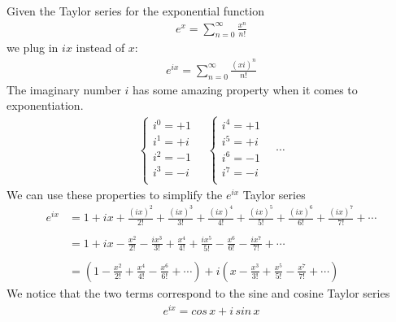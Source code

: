 \documentclass{article}
\begin{document}
Given the Taylor series for the exponential function
\begin{align*}
    e^x=\sum_{n=0}^{\infty}\frac{x^n}{n!}
\end{align*}
we plug in \(ix\) instead of \(x\):
\begin{align*}
    e^{ix}=\sum_{n=0}^{\infty}\frac{(xi)^n}{n!}
\end{align*}
The imaginary number \(i\) has some amazing property when it comes to exponentiation.
\begin{align*}
    \begin{cases}
        i^0=+1\\
        i^1=+i\\
        i^2=-1\\
        i^3=-i\\
    \end{cases}
    \quad
    \begin{cases}
        i^4=+1\\
        i^5=+i\\
        i^6=-1\\
        i^7=-i\\
    \end{cases}
    \quad
    \cdots
\end{align*}
We can use these properties to simplify the \(e^{ix}\) Taylor series
\begin{align*}
    e^{ix}
    &   =1
        +ix
        +\frac{(ix)^2}{2!}
        +\frac{(ix)^3}{3!}
        +\frac{(ix)^4}{4!}
        +\frac{(ix)^5}{5!}
        +\frac{(ix)^6}{6!}
        +\frac{(ix)^7}{7!}
        +\cdots
    \\
    \\
    &   =1
        +ix
        -\frac{x^2}{2!}
        -\frac{ix^3}{3!}
        +\frac{x^4}{4!}
        +\frac{ix^5}{5!}
        -\frac{x^6}{6!}
        -\frac{ix^7}{7!}
        +\cdots
    \\
    \\
    &=
    \left(
        1
        -\frac{x^2}{2!}
        +\frac{x^4}{4!}
        -\frac{x^6}{6!}
        +\cdots
    \right)
    +i
    \left(
        x
        -\frac{x^3}{3!}
        +\frac{x^5}{5!}
        -\frac{x^7}{7!}
        +\cdots
    \right)
\end{align*}
We notice that the two terms correspond to the sine and cosine Taylor series
\begin{align*}
    e^{ix}=cos\,x+i\,sin\,x
\end{align*}
\end{document}
